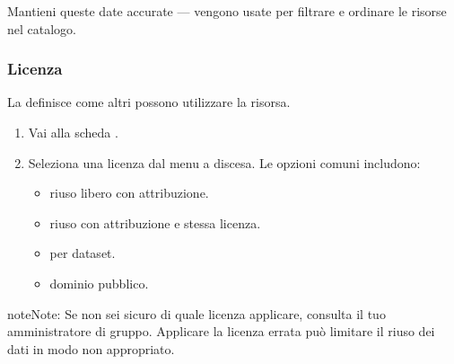 \documentclass[letterpaper,10pt,english]{sphinxmanual}
\begin{document}
\sphinxAtStartPar
Mantieni queste date accurate — vengono usate per filtrare e ordinare le risorse
nel catalogo.


\subsubsection{Licenza}
\label{\detokenize{it/03_gestire_metadati:licenza}}
\sphinxAtStartPar
La  definisce come altri possono utilizzare la risorsa.
\begin{enumerate}
%
\item {} 
\sphinxAtStartPar
Vai alla scheda .

\item {} 
\sphinxAtStartPar
Seleziona una licenza dal menu a discesa. Le opzioni comuni includono:
\begin{itemize}
\item {} 
\sphinxAtStartPar
{} \textendash{} riuso libero con attribuzione.

\item {} 
\sphinxAtStartPar
{} \textendash{} riuso con
attribuzione e stessa licenza.

\item {} 
\sphinxAtStartPar
{} \textendash{} per dataset.

\item {} 
\sphinxAtStartPar
{} \textendash{} dominio pubblico.

\end{itemize}

\end{enumerate}

\begin{sphinxadmonition}{note}{Note:}
\sphinxAtStartPar
Se non sei sicuro di quale licenza applicare, consulta il tuo amministratore di gruppo.
Applicare la licenza errata può limitare il riuso dei dati in modo non appropriato.
\end{sphinxadmonition}
\end{document}
